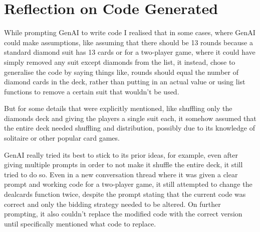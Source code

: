 \documentclass[10pt,onecolumn,letterpaper]{article}
\begin{document}
\section{Reflection on Code Generated}
While prompting GenAI to write code I realised that in some cases, where GenAI could make assumptions, like assuming that there should be 13 rounds because a standard diamond suit has 13 cards or for a two-player game, where it could have simply removed any suit except diamonds from the list, it instead, chose to generalise the code by saying things like, rounds should equal the number of diamond cards in the deck, rather than putting in an actual value or using list functions to remove a certain suit that wouldn’t be used.

But for some details that were explicitly mentioned, like shuffling only the diamonds deck and giving the players a single suit each, it somehow assumed that the entire deck needed shuffling and distribution, possibly due to its knowledge of solitaire or other popular card games.

GenAI really tried its best to stick to its prior ideas, for example, even after giving multiple prompts in order to not make it shuffle the entire deck, it still tried to do so. Even in a new conversation thread where it was given a clear prompt and working code for a two-player game, it still attempted to change the deal\textunderscore cards function twice, despite the prompt stating that the current code was correct and only the bidding strategy needed to be altered. On further prompting, it also couldn't replace the modified code with the correct version until specifically mentioned what code to replace.
\end{document}
